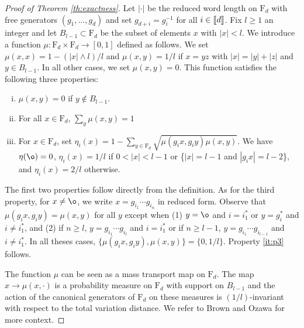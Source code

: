 \documentclass[11pt]{article}
\newcommand{\dF}{\mathrm{F}}
\newcommand{\1}{1\!\!{\sf I}}
\newcommand{\INT}[1]{{{\left[\hspace{-1.4pt}\left[#1\right]\hspace{-1.4pt}\right]}}}
\begin{document}
\begin{proof}[Proof of Theorem \ref{th:exactness}]
Let $|\cdot |$ be the reduced word length on $\dF_d$ with free generators $(g_1,\ldots,g_d)$ and set $g_{d+i} = g_i^{-1}$ for all $i \in \INT{d}$. Fix $l\geq 1$ an integer and let $B_{l-1} \subset \dF_d$ be the subset of elements $x$ with  $|x| <l$. We introduce a function $\mu: \dF_d\times \dF_d \to [0,1]$ defined as follows. We set $\mu (x,x)=1-(|x|\wedge l)/l$ and $\mu (x,y)=1/l$ if $x = y z$ with $|x|=|y|+|z|$ and $y \in B_{l-1}$. In all other cases, we set $\mu(x,y) =0$.   
This function satisfies the following three properties:
\begin{enumerate}[(i)]
\item \label{it:p1} $\mu (x,y)=0$ if $y \notin B_{l-1}$.
\item \label{it:p2} For all $x \in \dF_d$, $\sum_y \mu (x,y)=1$
\item \label{it:p3}  For $x \in \dF_d$, set $\eta_i(x) = 1-  \sum_{y \in \dF_d}\sqrt{\mu(g_i x  , g_i y )\mu(x ,  y)}$. We have $\eta(\o) = 0$, $\eta_i(x) = 1/l$ if $0 < |x| < l-1$ or \{$|x| =l-1$ and $|g_i x | = l-2$\}, and $\eta_i(x) = 2/l$ otherwise. 
\end{enumerate}
The first two properties follow directly from the definition. 
As for the third property, for $x \ne \o$, we write $x = g_{i_1} \cdots g_{i_n}$ in reduced form. Observe that $\mu (g_i x ,g_i y)=\mu (x,y)$ for all $y$ except when (1) $y = \o$ and $i = i_1^*$ or $y  = g_i^*$ and $i \ne i^*_1$, and (2) if $n \geq l$, $y =  g_{i_1}\cdots g_{i_{l}}$ and $i = i_1^*$ or  if $n \geq l-1$, $y =  g_{i_1}\cdots g_{i_{l-1}}$ and $i \ne i_1^*$. In all theses  cases, $ \{ \mu (g_i x, g_i y),\mu (x,y)\} = \{0,1/l\}$. Property \eqref{it:p3} follows.

The function $\mu$ can be seen as a mass transport map on $\dF_d$. The map $x\to \mu (x,\cdot )$ is a probability measure on $\dF_d$ with support on $B_{l-1}$ and the action of the canonical generators of $\dF_d$ on these measures is $(1/l)$-invariant with respect to the total variation distance. We refer to Brown and Ozawa \cite[Proposition 5.1.8]{MR2391387} for more context.


\end{proof}
\end{document}
